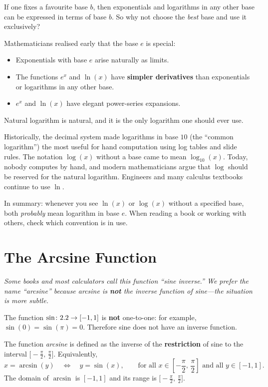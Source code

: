 If one fixes a favourite base $b$, then exponentials and logarithms in any other base can be expressed in terms of base $b$.  So why not choose the \emph{best} base and use it exclusively?

Mathematicians realised early that the base $e$ is special:
\begin{itemize}
  \item Exponentials with base $e$ arise naturally as limits.
  \item The functions $e^{x}$ and $\ln(x)$ have \textbf{simpler derivatives} than exponentials or logarithms in any other base.
  \item $e^{x}$ and $\ln(x)$ have elegant power-series expansions.
\end{itemize}
Natural logarithm is natural, and it is the only logarithm one should ever use.

\begin{remark}
Historically, the decimal system made logarithms in base $10$ (the ``common logarithm'') the most useful for hand computation using log tables and slide rules.  The notation $\log(x)$ without a base came to mean $\log_{10}(x)$.  Today, nobody computes by hand, and modern mathematicians argue that $\log$ should be reserved for the natural logarithm.  Engineers and many calculus textbooks continue to use $\ln$.

In summary: whenever you see $\ln(x)$ or $\log(x)$ without a specified base, both \emph{probably} mean logarithm in base $e$.  When reading a book or working with others, check which convention is in use.
\end{remark}

\section{The Arcsine Function}
\label{sec:4.12}

\textit{Some books and most calculators call this function ``sine inverse.''  We prefer the name ``arcsine'' because arcsine is \textbf{not} the inverse function of sine---the situation is more subtle.}

The function $\sin\colon 2.2 \to [-1,1]$ is \textbf{not} one-to-one: for example, $\sin(0) = \sin(\pi) = 0$.  Therefore sine does not have an inverse function.

\begin{definition}[Arcsine]
\label{def:4-8}
The function \emph{arcsine} is defined as the inverse of the \textbf{restriction} of sine to the interval $\bigl[-\frac{\pi}{2},\, \frac{\pi}{2}\bigr]$.  Equivalently,
\[
  x = \arcsin(y) \quad \Longleftrightarrow \quad y = \sin(x),
  \qquad \text{for all } x \in \left[-\frac{\pi}{2},\, \frac{\pi}{2}\right] \text{ and all } y \in [-1,1].
\]
The domain of $\arcsin$ is $[-1,1]$ and its range is $\bigl[-\frac{\pi}{2},\, \frac{\pi}{2}\bigr]$.
\end{definition}


